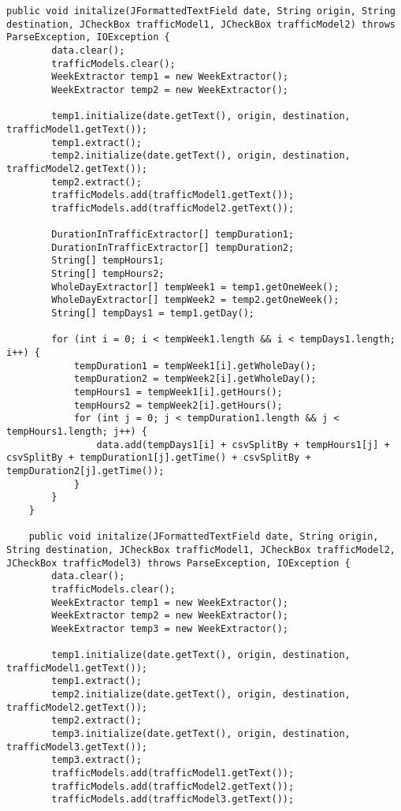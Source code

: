 \begin{lstlisting}[caption= DataProcessor.java]
    public void initalize(JFormattedTextField date, String origin, String destination, JCheckBox trafficModel1, JCheckBox trafficModel2) throws ParseException, IOException {
        data.clear();
        trafficModels.clear();
        WeekExtractor temp1 = new WeekExtractor();
        WeekExtractor temp2 = new WeekExtractor();

        temp1.initialize(date.getText(), origin, destination, trafficModel1.getText());
        temp1.extract();
        temp2.initialize(date.getText(), origin, destination, trafficModel2.getText());
        temp2.extract();
        trafficModels.add(trafficModel1.getText());
        trafficModels.add(trafficModel2.getText());

        DurationInTrafficExtractor[] tempDuration1;
        DurationInTrafficExtractor[] tempDuration2;
        String[] tempHours1;
        String[] tempHours2;
        WholeDayExtractor[] tempWeek1 = temp1.getOneWeek();
        WholeDayExtractor[] tempWeek2 = temp2.getOneWeek();
        String[] tempDays1 = temp1.getDay();

        for (int i = 0; i < tempWeek1.length && i < tempDays1.length; i++) {
            tempDuration1 = tempWeek1[i].getWholeDay();
            tempDuration2 = tempWeek2[i].getWholeDay();
            tempHours1 = tempWeek1[i].getHours();
            tempHours2 = tempWeek2[i].getHours();
            for (int j = 0; j < tempDuration1.length && j < tempHours1.length; j++) {
                data.add(tempDays1[i] + csvSplitBy + tempHours1[j] + csvSplitBy + tempDuration1[j].getTime() + csvSplitBy + tempDuration2[j].getTime());
            }
        }
    }

    public void initalize(JFormattedTextField date, String origin, String destination, JCheckBox trafficModel1, JCheckBox trafficModel2, JCheckBox trafficModel3) throws ParseException, IOException {
        data.clear();
        trafficModels.clear();
        WeekExtractor temp1 = new WeekExtractor();
        WeekExtractor temp2 = new WeekExtractor();
        WeekExtractor temp3 = new WeekExtractor();

        temp1.initialize(date.getText(), origin, destination, trafficModel1.getText());
        temp1.extract();
        temp2.initialize(date.getText(), origin, destination, trafficModel2.getText());
        temp2.extract();
        temp3.initialize(date.getText(), origin, destination, trafficModel3.getText());
        temp3.extract();
        trafficModels.add(trafficModel1.getText());
        trafficModels.add(trafficModel2.getText());
        trafficModels.add(trafficModel3.getText());


\end{lstlisting}
